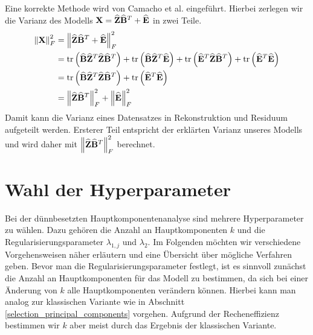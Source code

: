 Eine korrekte Methode wird von Camacho et al. eingeführt. Hierbei zerlegen wir die Varianz des Modells $\mathbf{X} = \widehat{\mathbf{Z}} \widehat{\mathbf{B}}^T + \widehat{\mathbf{E}}$ in zwei Teile.
\begin{align}
\label{camacho_explained_variance}
\left\lVert \mathbf{X} \right\rVert_F^2 & = \left\lVert \widehat{\mathbf{Z}} \widehat{\mathbf{B}}^T + \widehat{\mathbf{E}} \right\rVert_{F}^{2} \nonumber\\
& = \text{tr} \left( \widehat{\mathbf{B}} \widehat{\mathbf{Z}}^T \widehat{\mathbf{Z}} \widehat{\mathbf{B}}^T \right) + \text{tr} \left( \widehat{\mathbf{B}} \widehat{\mathbf{Z}}^T \widehat{\mathbf{E}} \right) + \text{tr} \left( \widehat{\mathbf{E}}^T\widehat{\mathbf{Z}} \widehat{\mathbf{B}}^T \right) + \text{tr} \left( \widehat{\mathbf{E}}^T \widehat{\mathbf{E}} \right) \nonumber\\
& = \text{tr} \left( \widehat{\mathbf{B}} \widehat{\mathbf{Z}}^T \widehat{\mathbf{Z}} \widehat{\mathbf{B}}^T \right) + \text{tr} \left( \widehat{\mathbf{E}}^T \widehat{\mathbf{E}} \right) \nonumber\\
& = \left\lVert \widehat{\mathbf{Z}} \widehat{\mathbf{B}}^T \right\rVert_{F}^{2} + \left\lVert \widehat{\mathbf{E}} \right\rVert_{F}^{2}
\end{align}
Damit kann die Varianz eines Datensatzes in Rekonstruktion und Residuum aufgeteilt werden. Ersterer Teil entspricht der erklärten Varianz unseres Modells und wird daher mit $\left\lVert \widehat{\mathbf{Z}} \widehat{\mathbf{B}}^T \right\rVert_{F}^{2}$ berechnet. 



\section{Wahl der Hyperparameter}
\label{choice_of_tuning_parameters}

Bei der dünnbesetzten Hauptkomponentenanalyse sind mehrere Hyperparameter zu wählen. Dazu gehören die Anzahl an Hauptkomponenten $k$ und die Regularisierungsparameter $\lambda_{1,j}$ und $\lambda_2$. Im Folgenden möchten wir verschiedene Vorgehensweisen näher erläutern und eine Übersicht über mögliche Verfahren geben. Bevor man die Regularisierungsparameter festlegt, ist es sinnvoll zunächst die Anzahl an Hauptkomponenten für das Modell zu bestimmen, da sich bei einer Änderung von $k$ alle Hauptkomponenten verändern können. Hierbei kann man analog zur klassischen Variante wie in Abschnitt \ref{selection_principal_components} vorgehen. Aufgrund der Recheneffizienz bestimmen wir $k$ aber meist durch das Ergebnis der klassischen Variante.

